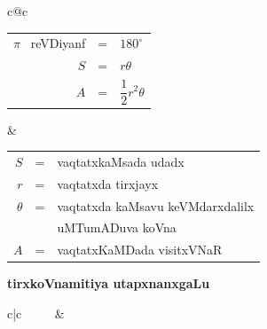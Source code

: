 \begin{center}
\begin{tabular}{c@{\qquad\quad}c}
\begin{tabular}[t]{r@{\;\;}c@{\;\;}l}
$\pi$~ reVDiyanf & = & $180^{\circ}$\\[3pt]
$S$ & = & $r\theta$\\[3pt]
$A$ & = & $\dfrac{1}{2}r^{2}\theta$
\end{tabular}
&
\begin{tabular}[t]{r@{\;\;}c@{\;\;}l}
$S$ & = & vaqtatxkaMsada udadx\\[3pt]
$r$ & = & vaqtatxda tirxjayx\\[3pt]
$\theta$ & = & vaqtatxda kaMsavu keVMdarxdalilx\\[1pt]
         &   & uMTumADuva koVna\\[3pt]
$A$ & = & vaqtatxKaMDada visitxVNaR
\end{tabular}
\end{tabular}
\end{center}

\eject

\begin{center}
{\large\bf tirxkoVnamitiya utapxnanxgaLu}
\smallskip
 
{\large\bf {}}
\end{center}

\begin{tabular}{c|c}
~~~~
& 
~~~
\end{tabular}


